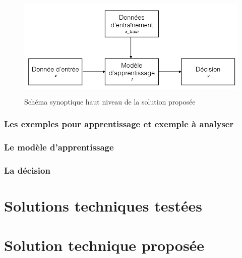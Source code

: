 \begin{figure}[h]
	\centering\includegraphics[height=5cm]{images/ML_high_level.jpeg}
	\caption{Schéma synoptique haut niveau de la solution proposée}
	\label{fig:Schéma synoptique haut niveau de la solution proposée: couche root cause}
\end{figure}

\subsubsection{Les exemples pour apprentissage et exemple à analyser}
\label{Automatisation du processus d'investigation: Achitecture High Level du système proposé: Les exemples d'apprentissage}

\subsubsection{Le modèle d'apprentissage}
\label{Automatisation du processus d'investigation: Achitecture High Level du système proposé: Le modèle d'apprentissage}

\subsubsection{La décision}
\label{Automatisation du processus d'investigation: Achitecture High Level du système proposé: La décision}



\section{Solutions techniques testées}
\label{Automatisation du processus d'investigation: Solutions techniques testées}




\section{Solution technique proposée}
\label{Automatisation du processus d'investigation: Solution technique proposée}

